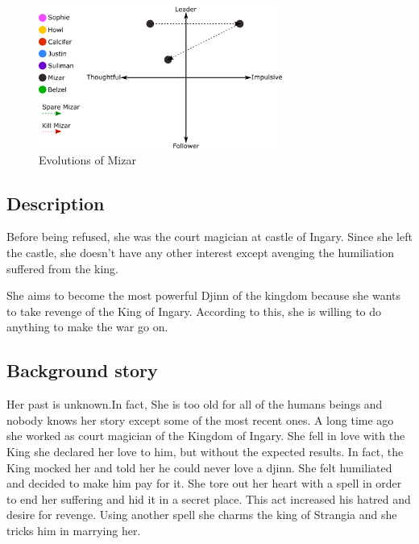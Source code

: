 \begin{figure}[H]
  \centering
  \includegraphics[width=8cm]{Images/Evolutions/mizarEvolution}
  \caption{Evolutions of Mizar}
\end{figure}

\subsection{Description}
Before being refused, she was the court magician at castle of Ingary. Since she left the castle, she doesn't have any other interest except avenging the humiliation suffered from the king.

She aims to become the most powerful Djinn of the kingdom because she wants to take revenge of the King of Ingary. According to this, she is willing to do anything to make the war go on.

\subsection{Background story}
Her past is unknown.In fact, She is too old for all of the humans beings and nobody knows her story except some of the most recent ones. A long time ago she worked as court magician of the Kingdom of Ingary. She fell in love with the King she declared her love to him, but without the expected results. In fact, the King mocked her and told her he could never love a djinn. She felt humiliated and decided to make him pay for it. She tore out her heart with a spell in order to end her suffering and hid it in a secret place. This act increased his hatred and desire for revenge. Using another spell she charms the king of Strangia and she tricks him in marrying her.
